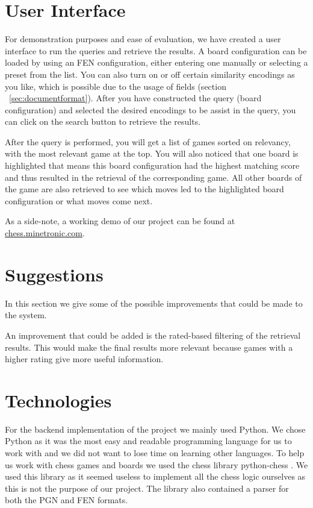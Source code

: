 \documentclass[11pt]{article}
\begin{document}


    \section{User Interface}

    For demonstration purposes and ease of evaluation, we have created a user interface to run the queries and retrieve the results. A board configuration can be loaded by using an FEN configuration, either entering one manually or selecting a preset from the list. You can also turn on or off certain similarity encodings as you like, which is possible due to the usage of fields (section ~\ref{sec:documentformat}). After you have constructed the query (board configuration) and selected the desired encodings to be assist in the query, you can click on the search button to retrieve the results.

    After the query is performed, you will get a list of games sorted on relevancy, with the most relevant game at the top. You will also noticed that one board is highlighted that means this board configuration had the highest matching score and thus resulted in the retrieval of the corresponding game. All other boards of the game are also retrieved to see which moves led to the highlighted board configuration or what moves come next.

    As a side-note, a working demo of our project can be found at \href{http://chess.minetronic.com}{chess.minetronic.com}.


    \section{Suggestions}

    In this section we give some of the possible improvements that could be made to the system.

    An improvement that could be added is the rated-based filtering of the retrieval results. This would make the final results more relevant because games with a higher rating give more useful information.


    \section{Technologies}

    For the backend implementation of the project we mainly used Python. We chose Python as it was the most easy and readable programming language for us to work with and we did not want to lose time on learning other languages. To help us work with chess games and boards we used the chess library python-chess \cite{python-chess}. We used this library as it seemed useless to implement all the chess logic ourselves as this is not the purpose of our project. The library also contained a parser for both the PGN and FEN formats.

    

\end{document}
